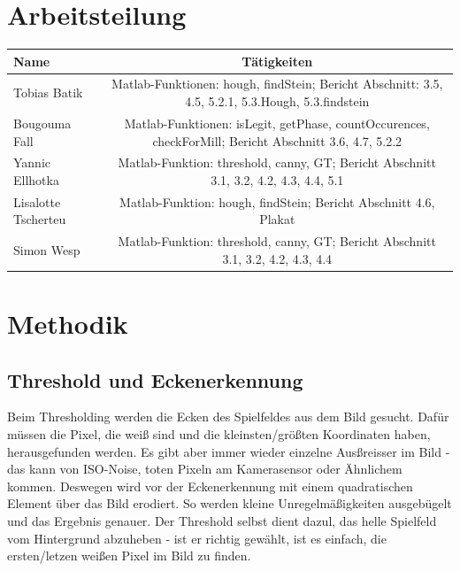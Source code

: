 \documentclass[paper=A4, deutsch]{scrartcl}
\begin{document}
\section{Arbeitsteilung}
\begin{center}
  \begin{tabular}{ |l | c | }
    \hline
  Name & Tätigkeiten\\
    \hline
			Tobias Batik & Matlab-Funktionen: hough, findStein; Bericht Abschnitt: 3.5, 4.5, 5.2.1, 5.3.Hough, 5.3.findstein\\
		\hline
			Bougouma Fall & Matlab-Funktionen: isLegit, getPhase, countOccurences, checkForMill; Bericht Abschnitt 3.6, 4.7, 5.2.2\\
		\hline
			Yannic Ellhotka & Matlab-Funktion: threshold, canny, GT; Bericht Abschnitt 3.1, 3.2, 4.2, 4.3, 4.4, 5.1\\
		\hline
			Lisalotte Tscherteu & Matlab-Funktion: hough, findStein; Bericht Abschnitt 4.6, Plakat\\
		\hline
			Simon Wesp & Matlab-Funktion: threshold, canny, GT; Bericht Abschnitt 3.1, 3.2, 4.2, 4.3, 4.4\\
		\hline
  \end{tabular}
\end{center}


\section{Methodik}

\subsection{Threshold und Eckenerkennung}
Beim Thresholding werden die Ecken des Spielfeldes aus dem Bild gesucht. Dafür müssen die Pixel, die weiß sind und die kleinsten/größten Koordinaten haben, herausgefunden werden. Es gibt aber immer wieder einzelne Ausßreisser im Bild - das kann von ISO-Noise, toten Pixeln am Kamerasensor oder Ähnlichem kommen. Deswegen wird vor der Eckenerkennung mit einem quadratischen Element über das Bild erodiert. So werden kleine Unregelmäßigkeiten ausgebügelt und das Ergebnis genauer. Der Threshold selbst dient dazul, das helle Spielfeld vom Hintergrund abzuheben - ist er richtig gewählt, ist es einfach, die ersten/letzen weißen Pixel im Bild zu finden.
\end{document}
